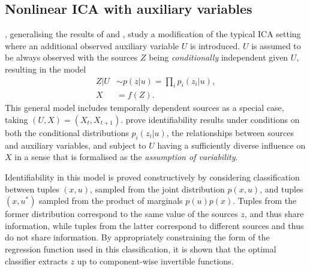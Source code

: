 





\subsection{Nonlinear ICA with auxiliary variables}\label{subsec:ica-literature-nonlinear-ica-with-aux}

\cite{hyvarinen19a}, generalising the results of \cite{hyvarinen2016unsupervised} and \cite{hyvarinen2017nonlinear}, study a modification of the typical ICA setting where an additional observed auxiliary variable $U$ is introduced.
$U$ is assumed to be always observed with the sources $Z$ being \emph{conditionally} independent given $U$, resulting in the model
%
%
\begin{align}
Z | U &\sim p(z|u) = \prod_{i} p_i(z_i | u), \\
X &= f(Z).
\end{align}
%
This general model includes temporally dependent sources as a special case, taking $(U, X)= (X_t,X_{t+1})$.
\cite{hyvarinen19a} prove identifiability results under conditions on both the conditional distributions $p_i(z_i | u)$, the relationships between sources and auxiliary variables, and subject to $U$ having a sufficiently diverse influence on $X$ in a sense that is formalised as the \emph{assumption of variability}.

Identifiability in this model is proved constructively by considering classification between tuples $(x, u)$, sampled from the joint distribution $p(x, u)$, and tuples $(x, u^*)$ sampled from the product of marginals $p(u)p(x)$.
Tuples from the former distribution correspond to the same value of the sources $z$, and thus share information, while tuples from the latter correspond to different sources and thus do not share information.
By appropriately constraining the form of the regression function used in this classification, it is shown that the optimal classifier extracts $z$ up to component-wise invertible functions.

